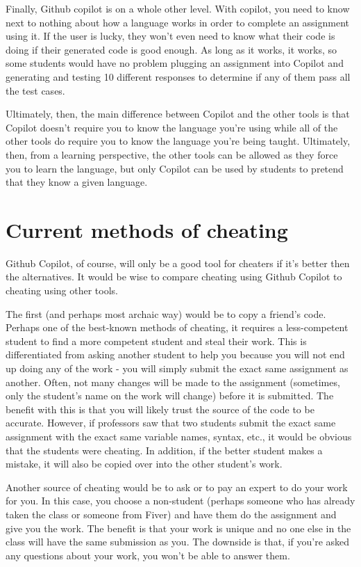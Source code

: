 \documentclass{article}
\begin{document}
Finally, Github copilot is on a whole other level. With copilot, you need to know next to nothing about how a language works in order to complete an assignment using it. If the user is lucky, they won't even need to know what their code is doing if their generated code is good enough. As long as it works, it works, so some students would have no problem plugging an assignment into Copilot and generating and testing 10 different responses to determine if any of them pass all the test cases.

Ultimately, then, the main difference between Copilot and the other tools is that Copilot doesn't require you to know the language you're using while all of the other tools do require you to know the language you're being taught. Ultimately, then, from a learning perspective, the other tools can be allowed as they force you to learn the language, but only Copilot can be used by students to pretend that they know a given language.

\section{Current methods of cheating}

Github Copilot, of course, will only be a good tool for cheaters if it's better then the alternatives. It would be wise to compare cheating using Github Copilot to cheating using other tools.

The first (and perhaps most archaic way) would be to copy a friend's code. Perhaps one of the best-known methods of cheating, it requires a less-competent student to find a more competent student and steal their work. This is differentiated from asking another student to help you because you will not end up doing any of the work - you will simply submit the exact same assignment as another. Often, not many changes will be made to the assignment (sometimes, only the student's name on the work will change) before it is submitted. The benefit with this is that you will likely trust the source of the code to be accurate. However, if professors saw that two students submit the exact same assignment with the exact same variable names, syntax, etc., it would be obvious that the students were cheating. In addition, if the better student makes a mistake, it will also be copied over into the other student's work.

Another source of cheating would be to ask or to pay an expert to do your work for you. In this case, you choose a non-student (perhaps someone who has already taken the class or someone from Fiver) and have them do the assignment and give you the work. The benefit is that your work is unique and no one else in the class will have the same submission as you. The downside is that, if you're asked any questions about your work, you won't be able to answer them.
\end{document}
